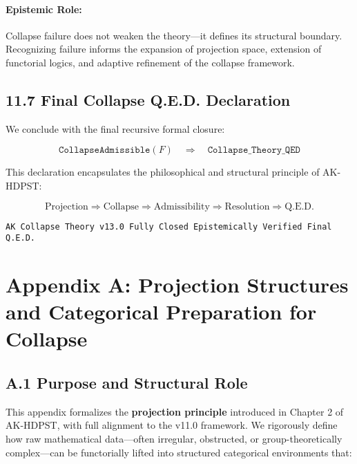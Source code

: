 \documentclass[11pt]{article}
\begin{document}
\paragraph{Epistemic Role:}

Collapse failure does not weaken the theory—it defines its structural boundary. Recognizing failure informs the expansion of projection space, extension of functorial logics, and adaptive refinement of the collapse framework.

\subsection*{11.7 Final Collapse Q.E.D. Declaration}

We conclude with the final recursive formal closure:

\[
\boxed{
\texttt{CollapseAdmissible}(F) \quad \Longrightarrow \quad \texttt{Collapse\_Theory\_QED}
}
\]

This declaration encapsulates the philosophical and structural principle of AK-HDPST:

\[
\boxed{
\text{Projection} \Rightarrow \text{Collapse} \Rightarrow \text{Admissibility} \Rightarrow \text{Resolution} \Rightarrow \text{Q.E.D.}
}
\]

\begin{flushright}
\texttt{AK Collapse Theory v13.0 \quad Fully Closed \quad Epistemically Verified \quad Final Q.E.D.}
\end{flushright}



\appendix
\section*{Appendix A: Projection Structures and Categorical Preparation for Collapse}

\subsection*{A.1 Purpose and Structural Role}

This appendix formalizes the \textbf{projection principle} introduced in Chapter 2 of AK-HDPST, with full alignment to the v11.0 framework. We rigorously define how raw mathematical data—often irregular, obstructed, or group-theoretically complex—can be functorially lifted into structured categorical environments that:
\end{document}
